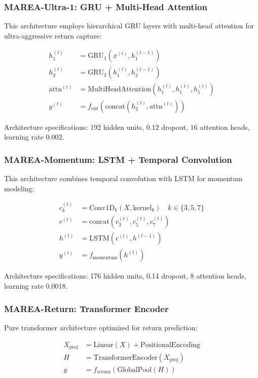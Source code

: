 \documentclass[10pt,twocolumn]{article}
\begin{document}
\subsubsection{MAREA-Ultra-1: GRU + Multi-Head Attention}

This architecture employs hierarchical GRU layers with multi-head attention for ultra-aggressive return capture:

\begin{align}
h_1^{(t)} &= \text{GRU}_1(x^{(t)}, h_1^{(t-1)}) \\
h_2^{(t)} &= \text{GRU}_2(h_1^{(t)}, h_2^{(t-1)}) \\
\text{attn}^{(t)} &= \text{MultiHeadAttention}(h_1^{(t)}, h_1^{(t)}, h_1^{(t)}) \\
y^{(t)} &= f_{\text{out}}(\text{concat}(h_2^{(t)}, \text{attn}^{(t)}))
\end{align}

Architecture specifications: 192 hidden units, 0.12 dropout, 16 attention heads, learning rate 0.002.

\subsubsection{MAREA-Momentum: LSTM + Temporal Convolution}

This architecture combines temporal convolution with LSTM for momentum modeling:

\begin{align}
c_k^{(t)} &= \text{Conv1D}_k(X, \text{kernel}_k) \quad k \in \{3,5,7\} \\
c^{(t)} &= \text{concat}(c_3^{(t)}, c_5^{(t)}, c_7^{(t)}) \\
h^{(t)} &= \text{LSTM}(c^{(t)}, h^{(t-1)}) \\
y^{(t)} &= f_{\text{momentum}}(h^{(t)})
\end{align}

Architecture specifications: 176 hidden units, 0.14 dropout, 8 attention heads, learning rate 0.0018.

\subsubsection{MAREA-Return: Transformer Encoder}

Pure transformer architecture optimized for return prediction:

\begin{align}
X_{\text{proj}} &= \text{Linear}(X) + \text{PositionalEncoding} \\
H &= \text{TransformerEncoder}(X_{\text{proj}}) \\
y &= f_{\text{return}}(\text{GlobalPool}(H))
\end{align}
\end{document}
